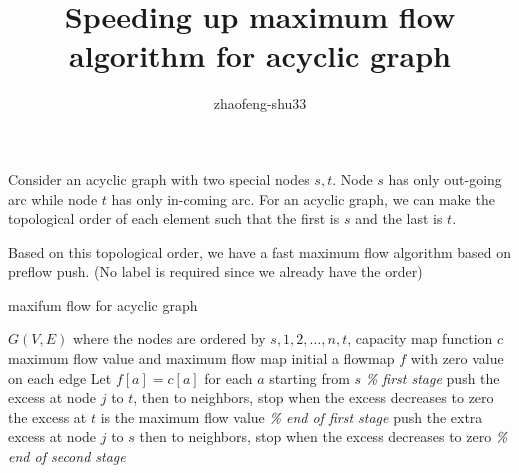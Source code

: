 \documentclass{article}
\title{Speeding up maximum flow algorithm for acyclic graph}
\author{zhaofeng-shu33}
\theoremstyle{definition}
\begin{document}
Consider an acyclic graph with two special nodes $s, t$. Node $s$ has only out-going arc while node $t$ has only in-coming arc.
For an acyclic graph, we can make the topological order of each element such that the first is $s$ and the last is $t$.

Based on this topological order, we have a fast maximum flow algorithm based on preflow push. (No label is required since we already have the order)
\begin{algorithm}
\caption{maxifum flow for acyclic graph}\label{alg:aic}
	\begin{algorithmic}[1]
		\REQUIRE $G(V,E)$ where the nodes are ordered by $s, 1, 2, \dots, n, t$, capacity map function $c$
		\ENSURE maximum flow value and maximum flow map
		\STATE initial a flowmap $f$ with zero value on each edge
		\STATE Let $f[a] = c[a]$ for each $a$ starting from $s$  \textit{\% first stage}
			\STATE push the excess at node $j$ to $t$, then to neighbors, stop when the excess decreases to zero
		\ENDFOR
	      \STATE the excess at $t$ is the maximum flow value \textit{\% end of first stage}
			\STATE push the extra excess at node $j$ to $s$ then to neighbors, stop when the excess decreases to zero
		\ENDFOR  \textit{\% end of second stage}
           
	\end{algorithmic}
\end{algorithm}
\end{document}
